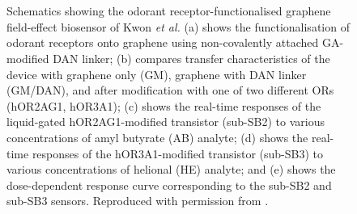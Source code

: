 \documentclass[
  a4paper,
]{scrbook}
\begin{document}
\begin{figure}
\begin{minipage}[t]{0.03\linewidth}
{{}

}

\end{minipage}%
%
\begin{minipage}[t]{0.01\linewidth}

{\centering 

~

}

\end{minipage}%
%
\begin{minipage}[t]{0.45\linewidth}

{\centering 


}

\end{minipage}%
%
\begin{minipage}[t]{0.01\linewidth}

{\centering 

~

}

\end{minipage}%

\caption{\label{fig-kwon-multiplexed}Schematics showing the odorant
receptor-functionalised graphene field-effect biosensor of Kwon \emph{et
al.} (a) shows the functionalisation of odorant receptors onto graphene
using non-covalently attached GA-modified DAN linker; (b) compares
transfer characteristics of the device with graphene only (GM), graphene
with DAN linker (GM/DAN), and after modification with one of two
different ORs (hOR2AG1, hOR3A1); (c) shows the real-time responses of
the liquid-gated hOR2AG1-modified transistor (sub-SB2) to various
concentrations of amyl butyrate (AB) analyte; (d) shows the real-time
responses of the hOR3A1-modified transistor (sub-SB3) to various
concentrations of helional (HE) analyte; and (e) shows the
dose-dependent response curve corresponding to the sub-SB2 and sub-SB3
sensors. Reproduced with permission from \autocite{Kwon2015}.}

\end{figure}
\end{document}
